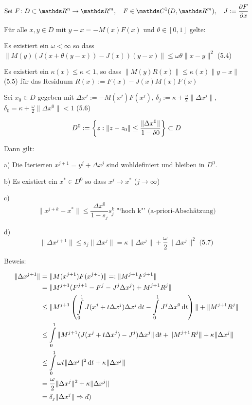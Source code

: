 
\[ \text{Sei } F\colon D \subset \R^n \to \R^m, \quad F \in \C^1(D,\R^m), \quad J := \frac{\partial F}{\partial x} \]

Für alle $x,y \in D$ mit $y-x = -M(x) F(x)$ und $\theta \in [0,1]$ gelte:

\bitm
\item Es existiert ein $\omega < \infty$ so dass $\| M(y) (J(x+\theta(y-x)) - J(x)) (y-x) \| \leq \omega \theta \|x-y\|^2$ (5.4)
\item Es existiert ein $\kappa(x) \leq \kappa < 1$, so dass $\| M(y) R(x) \| \leq \kappa(x) \|y-x\|$ (5.5) für das Residuum $R(x) := F(x) - J(x)M(x)F(x)$
\item Sei $x_0 \in D$ gegeben mit $\Delta x^j := -M(x^j) F(x^j)$, $\delta_j := \kappa + \frac \omega 2 \| \Delta x^j \|$, $\delta_0 = \kappa + \frac \omega 2 \|\Delta x^0 \| < 1$ (5.6)
\item \[ D^0 := \left\{ z : \|z-z_0\| \leq \frac{\|\Delta x^0\|}{1-\delta 0} \right\} \subset D \]
\eitm

Dann gilt:

\bitm
\item a) Die Iterierten $x^{j+1} = y^j + \Delta x^j$ sind wohldefiniert und bleiben in $D^0$.
\item b) Es existiert ein $x^* \in D^0$ so dass $x^j \to x^*$ ($j \to \infty$)
\item c) \[ \| x^{j+k} - x^*\| \leq \frac{\Delta x^0}{1-s_j} s_j^k \text{ "`hoch k"' (a-priori-Abschätzung)} \]
\item d) \[ \| \Delta x^{j+1} \| \leq s_j \| \Delta x^j \| = \kappa \| \Delta x^j \| + \frac \omega 2 \| \Delta x^j\|^2 \text{ (5.7)} \]
\eitm

Beweis:

\begin{align*}
\| \Delta x^{j+1} \| &= \| M(x^{j+1}) F(x^{j+1}) \| =: \| M^{j+1} F^{j+1} \| \\
&= \| M^{j+1} (F^{j+1} - F^j - J^j \Delta x^j) + M^{j+1} R^j \| \\
& \leq \| M^{j+1} \left( \int\limits_0^1 J(x^j + t \Delta x^j) \Delta x^j \,\mathrm d t - \int\limits_0^1 J^j \Delta x^0 \,\mathrm d t \right)\| + \|M^{j+1} R^j \| \\
&\leq \int\limits_0^1 \| M^{j+1} (J(x^j + t \Delta x^j) - J^j) \Delta x^j \| \,\mathrm d t + \|M^{j+1} R^j \| + \kappa \| \Delta x^j \| \\
&\leq \int\limits_0^1 \omega t \| \Delta x^j \|^2 \,\mathrm d t + \kappa \|\Delta x^j \| \\
&= \frac \omega 2 \|\Delta x^j\|^2 + \kappa \| \Delta x^j \| \\
&= \delta_j \| \Delta x^j \| \Rightarrow d) \\
\end{align*}

